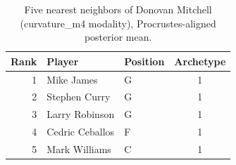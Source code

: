 \begin{table}[htbp]
  \centering\small
  \begin{tabular}{rllc}
    \toprule
    Rank & Player & Position & Archetype \\
    \midrule
    1 & Mike James & G & 1 \\
    2 & Stephen Curry & G & 1 \\
    3 & Larry Robinson & G & 1 \\
    4 & Cedric Ceballos & F & 1 \\
    5 & Mark Williams & C & 1 \\
    \bottomrule
  \end{tabular}
  \caption{Five nearest neighbors of Donovan Mitchell (curvature_m4 modality), Procrustes-aligned posterior mean.}
  \label{tab:Donovan_Mitchell_neighbors_curvature_m4}
\end{table}

